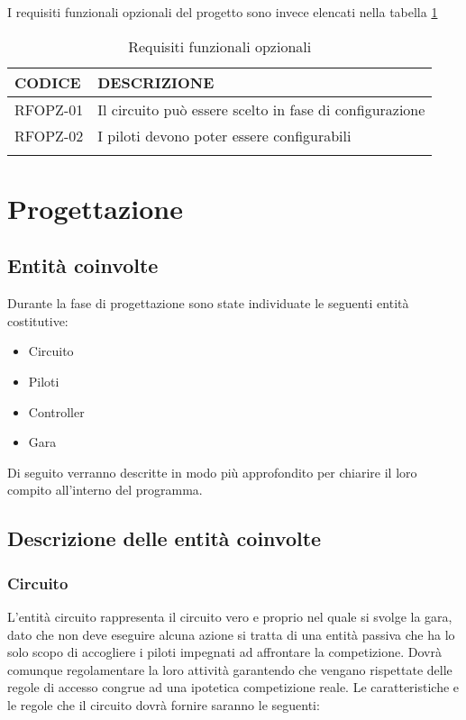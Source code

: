 \documentclass[a4paper,11pt, twoside]{book}
\begin{document}
    I requisiti funzionali opzionali del progetto sono invece elencati nella tabella \ref{tbl:RequisitiFunzionaliOpzionali}
    
    \begin{longtable}{|p{2cm}|p{8cm}|}
      \toprule
	\bfseries{CODICE} & \bfseries{DESCRIZIONE} \\\hline
      \endfirsthead
      RFOPZ-01 & Il circuito può essere scelto in fase di configurazione \\\cline{1-2}
      RFOPZ-02 & I piloti devono poter essere configurabili \\\cline{1-2}
      \caption{Requisiti funzionali opzionali}
      \label{tbl:RequisitiFunzionaliOpzionali}
    \end{longtable}
    
  
  \chapter{Progettazione}
    \section{Entità coinvolte}
      Durante la fase di progettazione sono state individuate le seguenti entità costitutive:
      
      \begin{itemize}
	\item Circuito
	\item Piloti
	\item Controller
	\item Gara 
      \end{itemize}
      
      Di seguito verranno descritte in modo più approfondito per chiarire il loro compito all'interno del
      programma.
      
    \section{Descrizione delle entità coinvolte}
      \subsection{Circuito}
	L'entità circuito rappresenta il circuito vero e proprio nel quale si svolge la gara, dato che non deve 
	eseguire alcuna azione si
	tratta di una entità passiva che ha lo solo scopo di accogliere i piloti impegnati ad affrontare la
	competizione.
	Dovrà comunque regolamentare la loro attività garantendo che vengano rispettate delle regole di accesso congrue
	ad una ipotetica competizione reale. 
	Le caratteristiche e le regole che il circuito dovrà fornire saranno le seguenti:
	
\end{document}
